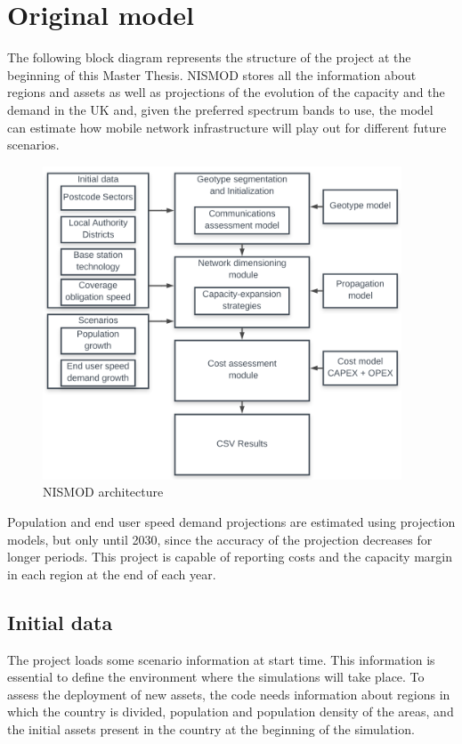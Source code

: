 \section{Original model}
The following block diagram represents the structure of the project at the beginning of this Master Thesis. NISMOD stores all the information about regions and assets as well as projections of the evolution of the capacity and the demand in the UK and, given the preferred spectrum bands to use, the model can estimate how mobile network infrastructure will play out for different future scenarios.
\begin{figure}[H]
	\begin{Center}
		\includegraphics[width=0.95\textwidth]{./media/image15.png}
		\caption{NISMOD architecture\cite{3-03}}
	\end{Center}
\end{figure}
Population and end user speed demand projections are estimated using projection models, but only until 2030, since the accuracy of the projection decreases for longer periods. This project is capable of reporting costs and the capacity margin in each region at the end of each year. \par

\subsection{Initial data}
The project loads some scenario information at start time. This information is essential to define the environment where the simulations will take place. To assess the deployment of new assets, the code needs information about regions in which the country is divided, population and population density of the areas, and the initial assets present in the country at the beginning of the simulation. \par

